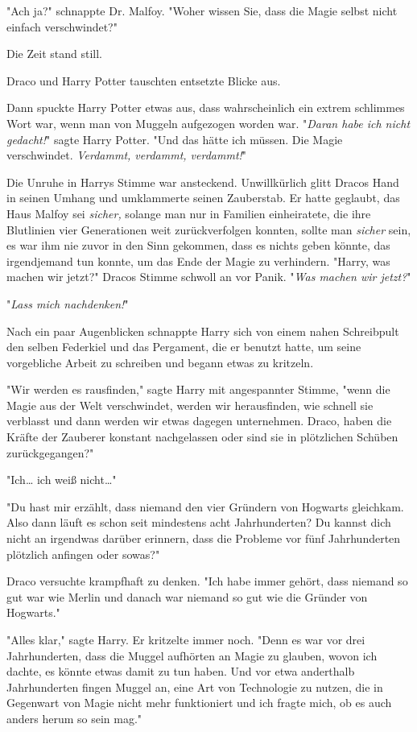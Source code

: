 {"Ach ja?" schnappte Dr. Malfoy. "Woher wissen Sie, dass die Magie selbst nicht einfach verschwindet?"

Die Zeit stand still.

Draco und Harry Potter tauschten entsetzte Blicke aus.

Dann spuckte Harry Potter etwas aus, dass wahrscheinlich ein extrem schlimmes Wort war, wenn man von Muggeln aufgezogen worden war. "\emph{Daran habe ich nicht gedacht!}" sagte Harry Potter. "Und das hätte ich müssen. Die Magie verschwindet. \emph{Verdammt, verdammt, verdammt!}"

Die Unruhe in Harrys Stimme war ansteckend. Unwillkürlich glitt Dracos Hand in seinen Umhang und umklammerte seinen Zauberstab. Er hatte geglaubt, das Haus Malfoy sei \emph{sicher,} solange man nur in Familien einheiratete, die ihre Blutlinien vier Generationen weit zurückverfolgen konnten, sollte man \emph{sicher} sein, es war ihm nie zuvor in den Sinn gekommen, dass es nichts geben könnte, das irgendjemand tun konnte, um das Ende der Magie zu verhindern. "Harry, was machen wir jetzt?" Dracos Stimme schwoll an vor Panik. "\emph{Was machen wir jetzt?}"

"\emph{Lass mich nachdenken!}"

Nach ein paar Augenblicken schnappte Harry sich von einem nahen Schreibpult den selben Federkiel und das Pergament, die er benutzt hatte, um seine vorgebliche Arbeit zu schreiben und begann etwas zu kritzeln.

"Wir werden es rausfinden," sagte Harry mit angespannter Stimme, "wenn die Magie aus der Welt verschwindet, werden wir herausfinden, wie schnell sie verblasst und dann werden wir etwas dagegen unternehmen. Draco, haben die Kräfte der Zauberer konstant nachgelassen oder sind sie in plötzlichen Schüben zurückgegangen?"

"Ich… ich weiß nicht…"

"Du hast mir erzählt, dass niemand den vier Gründern von Hogwarts gleichkam. Also dann läuft es schon seit mindestens acht Jahrhunderten? Du kannst dich nicht an irgendwas darüber erinnern, dass die Probleme vor fünf Jahrhunderten plötzlich anfingen oder sowas?"

Draco versuchte krampfhaft zu denken. "Ich habe immer gehört, dass niemand so gut war wie Merlin und danach war niemand so gut wie die Gründer von Hogwarts."

"Alles klar," sagte Harry. Er kritzelte immer noch. "Denn es war vor drei Jahrhunderten, dass die Muggel aufhörten an Magie zu glauben, wovon ich dachte, es könnte etwas damit zu tun haben. Und vor etwa anderthalb Jahrhunderten fingen Muggel an, eine Art von Technologie zu nutzen, die in Gegenwart von Magie nicht mehr funktioniert und ich fragte mich, ob es auch anders herum so sein mag."

}
